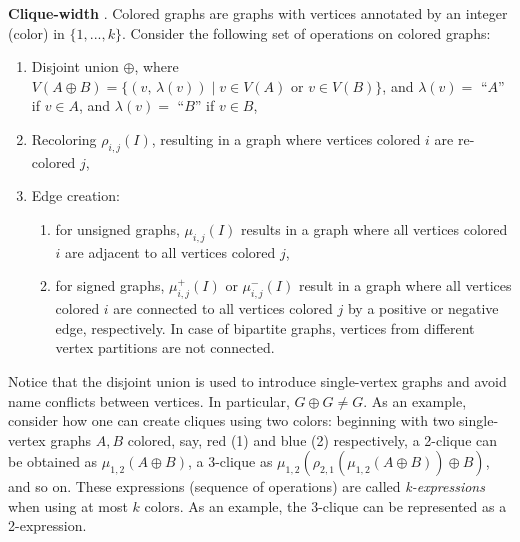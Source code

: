 
\noindent
\textbf{Clique-width} \cite{DBLP:journals/dam/FischerMR08}.
Colored graphs are graphs with vertices annotated by an integer (color) in $\{1,...,k\}$.
Consider the following set of operations on colored graphs:
\begin{enumerate}
	\item Disjoint union $\oplus$, where $V(A \oplus B)=\{ (v,\, \lambda(v)) \; | \; v \in V(A) \text{ or } v\in V(B) \}$, and $\lambda(v)=$ ``$A$'' if $v\in A$, and $\lambda(v)=$ ``$B$'' if $v\in B$,
	\item Recoloring $\rho_{i,j}(I)$, resulting in a graph where vertices colored $i$ are re-colored $j$,
	\item Edge creation:
	\begin{enumerate}
		\item for unsigned graphs, $\mu_{i,j}(I)$ results in a graph where all vertices colored $i$ are adjacent to all vertices colored $j$,
		\item for signed graphs, $\mu_{i,j}^+(I)$ or $\mu_{i,j}^-(I)$ result in a graph where all vertices colored $i$ are connected to all vertices colored $j$ by a positive or negative edge, respectively. In case of bipartite graphs, vertices from different vertex partitions are not connected.
	\end{enumerate}
\end{enumerate}

\noindent
Notice that the disjoint union is used to introduce single-vertex graphs and avoid name conflicts between vertices.
In particular, $G \oplus G \neq G$.
As an example, consider how one can create cliques using two colors: beginning with two single-vertex graphs $A, B$ colored, say, red (1) and blue (2) respectively, a 2-clique can be obtained as $\mu_{1,2}(A \oplus B)$, a 3-clique as $\mu_{1,2}(\rho_{2,1}(\mu_{1,2}(A \oplus B)) \oplus B)$, and so on.
These expressions (sequence of operations) are called {\em k-expressions} when using at most $k$ colors.
As an example, the 3-clique can be represented as a 2-expression.

